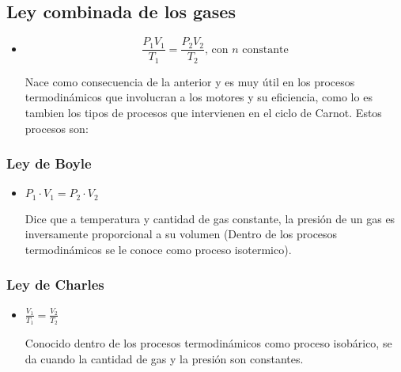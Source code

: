 \documentclass[letterpaper, 12pt]{article}
\begin{document}
\newpage

 \pagestyle{fancy}
            \fancyhf{}
            \cfoot{\thepage}

\subsection*{Ley combinada de los gases}

\begin{itemize}
    \item [\textcolor{Simbolos}{\bigcirc}]
    $$\frac{P_{1}V_{1}}{T_{1}} = \frac{P_{2}V_{2}}{T_{2}}\textrm{,    con }n \textrm{ constante}$$
    
    Nace como consecuencia de la anterior y es muy útil en los procesos termodinámicos que involucran a los motores y su eficiencia, como lo es tambien los tipos de procesos que intervienen en el ciclo de Carnot. Estos procesos son:
\end{itemize}    

    \subsubsection*{Ley de Boyle} 
    
    \begin{itemize}
        \item[\textcolor{Simbolos}{\circledast}]$P_{1}\cdot V_{1}=P_{2}\cdot V_{2} $
    
    
    Dice que a temperatura y cantidad de gas constante, la presión de un gas es inversamente proporcional a su volumen (Dentro de los procesos termodinámicos se le conoce como proceso isotermico).
    \end{itemize}
    
    \subsubsection*{Ley de Charles} 
    
    \begin{itemize}
        \item[\textcolor{Simbolos}{\circledast}]$\frac{V_{1}}{T_{1}}=\frac{V_{2}}{T_{2}} $
    
    
    Conocido dentro de los procesos termodinámicos como proceso isobárico, se da cuando la cantidad de gas y la presión son constantes.
    \end{itemize}
    
\end{document}
